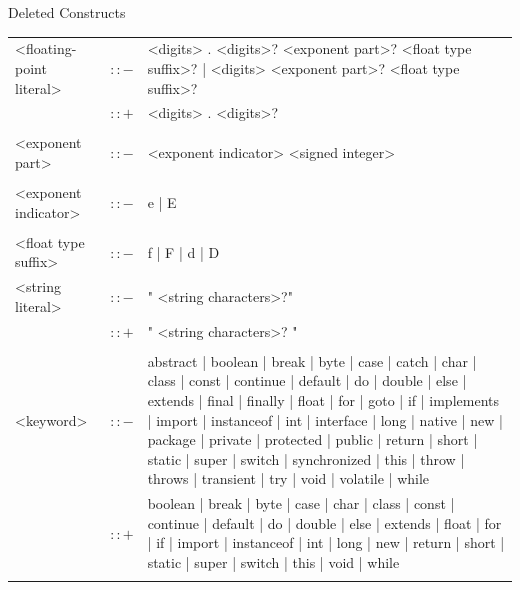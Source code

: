 \documentclass[landscape, 11pt]{article}
\begin{document}
\begin{qsection}{Deleted Constructs}
\begin{enumerate}[label=\bt{\theenumi.}]
\begin{longtable}{R{7cm} c L{15cm}}
				<floating-point literal>					&	$\colon\colon-$	&	<digits> . <digits>? <exponent part>? <float type suffix>? | <digits> <exponent part>? <float type suffix>? \\
															&	$\colon\colon+$	&	<digits> . <digits>? \\\\
				<exponent part>								&	$\colon\colon-$	&	<exponent indicator> <signed integer> \\\\
				<exponent indicator>						&	$\colon\colon-$	&	e | E \\\\
				<float type suffix>							&	$\colon\colon-$	&	f | F | d | D \\
				<string literal>							&	$\colon\colon-$	&	" <string characters>?" \\
															&	$\colon\colon+$	&	" <string characters>? " \\\\
				<keyword>									&	$\colon\colon-$	&	abstract | boolean | break | byte | case | catch | char | class | const | continue | default | do | double | else | extends | final | finally | float | for | goto | if | implements | import | instanceof | int | interface | long | native | new | package | private | protected | public | return | short | static | super | switch | synchronized | this | throw | throws | transient | try | void | volatile | while \\
															&	$\colon\colon+$	&	boolean | break | byte | case | char | class | const | continue | default | do | double | else | extends | float | for | if | import | instanceof | int | long | new | return | short | static | super | switch | this | void | while \\\\
		\end{longtable}

	\end{enumerate}


\end{qsection}
\end{document}
